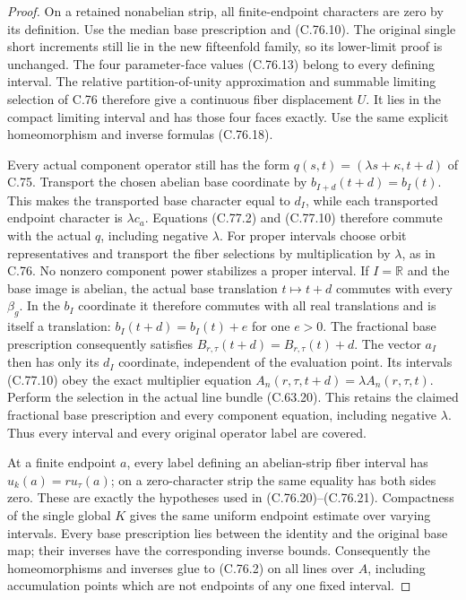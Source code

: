 \begin{proof}
On a retained nonabelian strip, all finite-endpoint
characters are zero by its definition. Use the median
base prescription and (C.76.10). The original single
short increments still lie in the new fifteenfold
family, so its lower-limit proof is unchanged.
The four parameter-face values (C.76.13) belong to
every defining interval. The relative partition-of-unity
approximation and summable limiting selection of C.76
therefore give a continuous fiber displacement $U$.
It lies in the compact limiting interval and has those
four faces exactly. Use the same explicit homeomorphism
and inverse formulas (C.76.18).

Every actual component operator still has the form
$q(s,t)=(\lambda s+\kappa,t+d)$ of C.75.
Transport the chosen abelian base coordinate by
$b_{I+d}(t+d)=b_I(t)$. This makes the transported
base character equal to $d_I$, while each transported
endpoint character is $\lambda c_a$.
Equations (C.77.2) and (C.77.10) therefore commute
with the actual $q$, including negative $\lambda$.
For proper intervals choose orbit representatives and
transport the fiber selections by multiplication by
$\lambda$, as in C.76. No nonzero component power
stabilizes a proper interval. If $I=\mathbb R$ and
the base image is abelian, the actual base translation
$t\mapsto t+d$ commutes with every $\beta_g$.
In the $b_I$ coordinate it therefore commutes with
all real translations and is itself a translation:
$b_I(t+d)=b_I(t)+e$ for one $e>0$.
The fractional base prescription consequently satisfies
$B_{r,\tau}(t+d)=B_{r,\tau}(t)+d$.
The vector $a_I$ then has only its $d_I$ coordinate,
independent of the evaluation point. Its intervals
(C.77.10) obey the exact multiplier equation
$A_n(r,\tau,t+d)=\lambda A_n(r,\tau,t)$.
Perform the selection in the actual line bundle
(C.63.20). This retains the claimed fractional base
prescription and every component equation, including
negative $\lambda$. Thus every interval and every
original operator label are covered.

At a finite endpoint $a$, every label defining an
abelian-strip fiber interval has
$u_k(a)=r u_\tau(a)$; on a zero-character strip the
same equality has both sides zero. These are exactly
the hypotheses used in (C.76.20)--(C.76.21).
Compactness of the single global $K$ gives the same
uniform endpoint estimate over varying intervals.
Every base prescription lies between the identity
and the original base map; their inverses have the
corresponding inverse bounds. Consequently the
homeomorphisms and inverses glue to (C.76.2) on all
lines over $A$, including accumulation points which
are not endpoints of any one fixed interval.


\end{proof}
